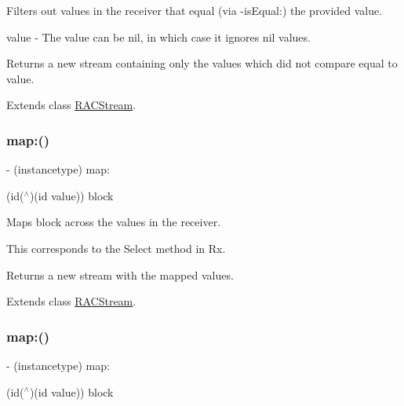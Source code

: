 Filters out values in the receiver that equal (via -\/is\+Equal\+:) the provided value.

value -\/ The value can be {\ttfamily nil}, in which case it ignores {\ttfamily nil} values.

Returns a new stream containing only the values which did not compare equal to {\ttfamily value}. 

Extends class \mbox{\hyperlink{interface_r_a_c_stream_aa0bf73c86006176e745390ee2b3645b2}{R\+A\+C\+Stream}}.

\mbox{\label{category_r_a_c_stream_07_operations_08_ae8e14cc70fb3979e6128d28b003bba3f}} 
\subsubsection{\texorpdfstring{map\+:()}{map:()}\hspace{0.1cm}{\footnotesize\ttfamily [1/3]}}
{\footnotesize\ttfamily -\/ (instancetype) map\+: \begin{DoxyParamCaption}\item[{(id($^\wedge$)(id value))}]{block }\end{DoxyParamCaption}}

Maps {\ttfamily block} across the values in the receiver.

This corresponds to the {\ttfamily Select} method in Rx.

Returns a new stream with the mapped values. 

Extends class \mbox{\hyperlink{interface_r_a_c_stream_ae8e14cc70fb3979e6128d28b003bba3f}{R\+A\+C\+Stream}}.

\mbox{\label{category_r_a_c_stream_07_operations_08_ae8e14cc70fb3979e6128d28b003bba3f}} 
\subsubsection{\texorpdfstring{map\+:()}{map:()}\hspace{0.1cm}{\footnotesize\ttfamily [2/3]}}
{\footnotesize\ttfamily -\/ (instancetype) map\+: \begin{DoxyParamCaption}\item[{(id($^\wedge$)(id value))}]{block }\end{DoxyParamCaption}}

